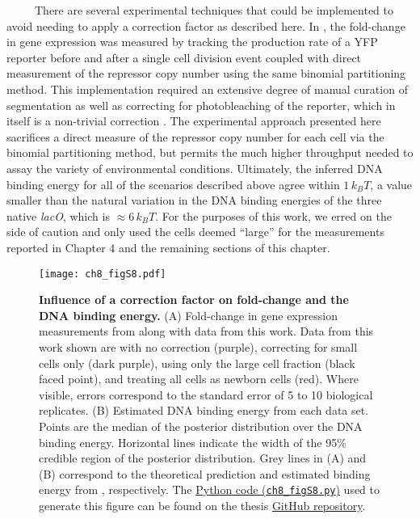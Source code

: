 \documentclass[12pt]{caltech_thesis}
\begin{document}
~~~~~There are several experimental techniques that could be implemented
to avoid needing to apply a correction factor as described here. In
\textcite{brewster2014}, the fold-change in gene expression was measured
by tracking the production rate of a YFP reporter before and after a
single cell division event coupled with direct measurement of the
repressor copy number using the same binomial partitioning method. This
implementation required an extensive degree of manual curation of
segmentation as well as correcting for photobleaching of the reporter,
which in itself is a non-trivial correction \autocite{garcia2011b}. The
experimental approach presented here sacrifices a direct measure of the
repressor copy number for each cell via the binomial partitioning
method, but permits the much higher throughput needed to assay the
variety of environmental conditions. Ultimately, the inferred DNA
binding energy for all of the scenarios described above agree within
\(1\, k_BT\), a value smaller than the natural variation in the DNA
binding energies of the three native \emph{lacO}, which is
\(\approx 6\, k_BT\). For the purposes of this work, we erred on the
side of caution and only used the cells deemed ``large'' for the
measurements reported in Chapter 4 and the remaining sections of this
chapter.

\hypertarget{fig:correction_factor}{%
\begin{figure}
\centering
\texttt{[image: ch8\_figS8.pdf]}
\caption[{Influence of a correction factor on fold-change and the DNA
binding energy.}]{\textbf{Influence of a correction factor on
fold-change and the DNA binding energy.} (A) Fold-change in gene
expression measurements from
\autocite{brewster2014,garcia2011,razo-mejia2018} along with data from
this work. Data from this work shown are with no correction (purple),
correcting for small cells only (dark purple), using only the large cell
fraction (black faced point), and treating all cells as newborn cells
(red). Where visible, errors correspond to the standard error of 5 to 10
biological replicates. (B) Estimated DNA binding energy from each data
set. Points are the median of the posterior distribution over the DNA
binding energy. Horizontal lines indicate the width of the 95\% credible
region of the posterior distribution. Grey lines in (A) and (B)
correspond to the theoretical prediction and estimated binding energy
from \textcite{garcia2011}, respectively. The
\href{https://github.com/gchure/phd/blob/master/src/chapter_08/code/ch8_figS8.py}{Python
code (\texttt{ch8\_figS8.py})} used to generate this figure can be found
on the thesis \href{https://github.com/gchure/phd}{GitHub repository}.}
\label{fig:correction_factor}
\end{figure}
}
\end{document}
